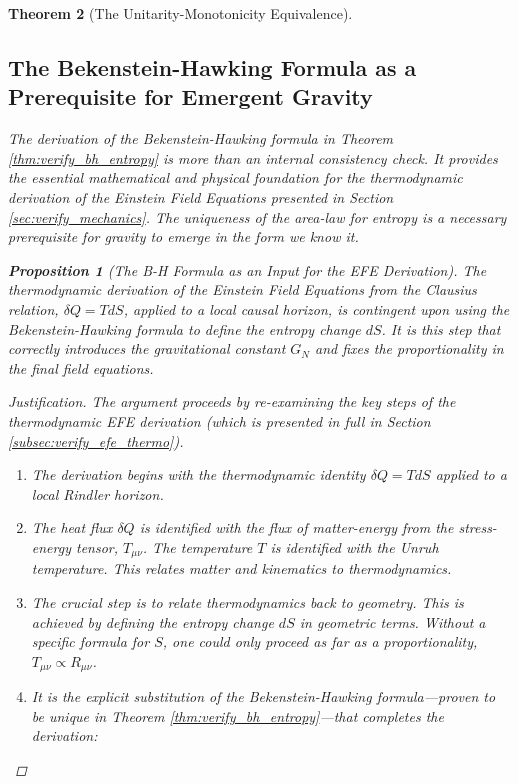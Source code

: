 \documentclass[11pt, letterpaper]{report}
\theoremstyle{plain} %
\newtheorem{theorem}{Theorem}[chapter]
\newtheorem{proposition}[theorem]{Proposition}
\theoremstyle{definition} %
\theoremstyle{remark} %
\begin{document}
\begin{theorem}[The Unitarity-Monotonicity Equivalence]
\subsection{The Bekenstein-Hawking Formula as a Prerequisite for Emergent Gravity}
\label{subsec:bh_as_prereq}

The derivation of the Bekenstein-Hawking formula in Theorem \ref{thm:verify_bh_entropy} is more than an internal consistency check. It provides the essential mathematical and physical foundation for the thermodynamic derivation of the Einstein Field Equations presented in Section \ref{sec:verify_mechanics}. The uniqueness of the area-law for entropy is a necessary prerequisite for gravity to emerge in the form we know it.

\begin{proposition}[The B-H Formula as an Input for the EFE Derivation]
\label{prop:bh_efe_link}
The thermodynamic derivation of the Einstein Field Equations from the Clausius relation, $\delta Q = TdS$, applied to a local causal horizon, is contingent upon using the Bekenstein-Hawking formula to define the entropy change $dS$. It is this step that correctly introduces the gravitational constant $G_N$ and fixes the proportionality in the final field equations.
\end{proposition}
\begin{proof}[Justification]
The argument proceeds by re-examining the key steps of the thermodynamic EFE derivation (which is presented in full in Section \ref{subsec:verify_efe_thermo}).
\begin{enumerate}
    \item The derivation begins with the thermodynamic identity $\delta Q = T dS$ applied to a local Rindler horizon.
    \item The heat flux $\delta Q$ is identified with the flux of matter-energy from the stress-energy tensor, $T_{\mu\nu}$. The temperature $T$ is identified with the Unruh temperature. This relates matter and kinematics to thermodynamics.
    \item The crucial step is to relate thermodynamics back to geometry. This is achieved by defining the entropy change $dS$ in geometric terms. Without a specific formula for $S$, one could only proceed as far as a proportionality, $T_{\mu\nu} \propto R_{\mu\nu}$.
    \item It is the explicit substitution of the Bekenstein-Hawking formula—proven to be unique in Theorem \ref{thm:verify_bh_entropy}—that completes the derivation:
    \begin{equation}

\end{equation}
\end{enumerate}
\end{proof}
\end{theorem}
\end{document}
